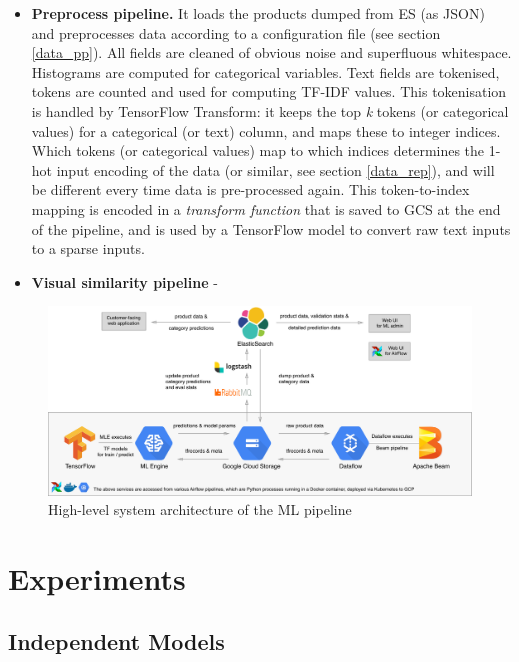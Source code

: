 \begin{itemize}
  \item \textbf{Preprocess pipeline.}
    It loads the products dumped from ES (as JSON) and preprocesses data according to a configuration file (see section \ref{data_pp}).
    All fields are cleaned of obvious noise and superfluous whitespace.
    Histograms are computed for categorical variables.
    Text fields are tokenised, tokens are counted and used for computing TF-IDF values.
    This tokenisation is handled by TensorFlow Transform: it keeps the top \textit{k} tokens (or categorical values) for a categorical (or text) column, and maps these to integer indices.
    Which tokens (or categorical values) map to which indices determines the 1-hot input encoding of the data (or similar, see section \ref{data_rep}), and will be different every time data is pre-processed again.
    This token-to-index mapping is encoded in a \textit{transform function} that is saved to GCS at the end of the pipeline, and is used by a TensorFlow model to convert raw text inputs to a  sparse inputs.
  \item \textbf{Visual similarity pipeline} -
\end{itemize}

\begin{figure}
  \hspace*{-0.2\textwidth}
  \includegraphics[width=1.4\textwidth]{diagrams/architecture}
  \caption{High-level system architecture of the ML pipeline}
  \label{arch_diagram}
\end{figure}

\section{Experiments}
\subsection{Independent Models}
\label{exp_models}

